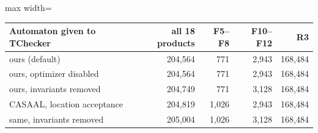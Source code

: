 \begin{adjustbox}{max width=\textwidth}\begin{tabular}{@{}lrrrr@{}}
\toprule
Automaton given to TChecker & all 18 products & F5--F8 & F10--F12 & R3 \\
\midrule
ours (default) & 204{,}564 & 771 & 2{,}943 & 168{,}484 \\
ours, optimizer disabled & 204{,}564 & 771 & 2{,}943 & 168{,}484 \\
ours, invariants removed & 204{,}749 & 771 & 3{,}128 & 168{,}484 \\
CASAAL, location acceptance & 204{,}819 & 1{,}026 & 2{,}943 & 168{,}484 \\
same, invariants removed & 205{,}004 & 1{,}026 & 3{,}128 & 168{,}484 \\
\bottomrule
\end{tabular}\end{adjustbox}
